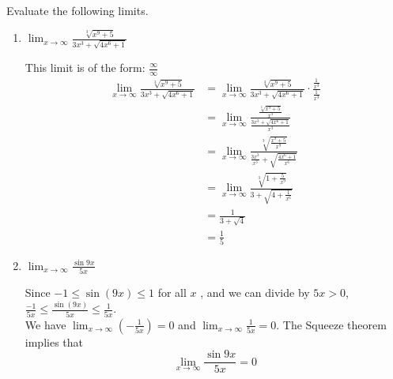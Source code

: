 \documentclass[nooutcomes,handout]{ximera}
\begin{document}
\begin{problem}
Evaluate the following limits.
	\begin{enumerate}
		\item $\lim_{x \to \infty} \frac{\sqrt[3]{x^9+5}}{3x^3+ \sqrt{4x^6+1}}$
		\begin{freeResponse}
		This limit is of the form: $\frac{\infty}{\infty}$
		\begin{align*}
		\lim_{x \to \infty} \frac{\sqrt[3]{x^9+5}}{3x^3+ \sqrt{4x^6+1}}
		&=\lim_{x \to \infty} \frac{\sqrt[3]{x^9+5}}{3x^3+ \sqrt{4x^6+1}}\cdot \frac{\frac{1}{x^3}}{\frac{1}{x^3}}\\
		&=\lim_{x \to \infty} \frac{\frac{\sqrt[3]{x^9+5}}{x^3}}{\frac{3x^3+ \sqrt{4x^6+1}}{x^3}}\\
		&=\lim_{x \to \infty}  \frac{\sqrt[3]{\frac{x^9+5}{x^9}}}{\frac{3x^3}{x^3}+ \sqrt{\frac{4x^6+1}{x^6}}}\\
		&=\lim_{x \to \infty}  \frac{\sqrt[3]{1+\frac{5}{x^9}}}{3+ \sqrt{4+\frac{1}{x^6}}}\\
		&=\frac{1}{3+ \sqrt{4}}\\
		&=\frac{1}{5}
		\end{align*}
		\end{freeResponse}

		\item $\lim_{x \to \infty} \frac{\sin{9x}}{5x}$
		\begin{freeResponse}
		 Since $-1 \le  \sin(9x) \le 1$ for all $x$ , and we can divide by $5x>0$, $\frac{-1}{5x} \le  \frac{\sin(9x)}{5x} \le \frac{1}{5x}$.\\
		  We have $\lim_{x \to \infty} \left(-\frac{1}{5x} \right) = 0$ and $\lim_{x \to \infty} \frac{1}{5x} = 0$.  The Squeeze theorem implies that
        \[
          \lim_{x \to \infty} \frac{\sin{9x}}{5x} = 0
        \]
		\end{freeResponse}
	\end{enumerate}
\end{problem}
\end{document}
